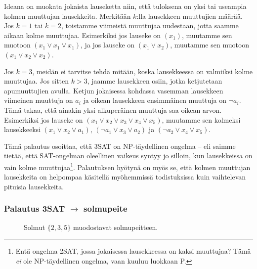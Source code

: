 Ideana on muokata jokaista lauseketta niin, 
että tuloksena on yksi tai useampia kolmen muuttujan lausekkeita.
Merkitään $k$:lla lausekkeen muuttujien määrää.
Jos $k=1$ tai $k=2$, toistamme viimeistä muuttujaa uudestaan,
jotta saamme aikaan kolme muuttujaa.
Esimerkiksi jos lauseke on $(x_1)$, muutamme sen muotoon
$(x_1 \lor x_1 \lor x_1)$, ja jos lauseke on $(x_1 \lor x_2)$, muutamme
sen muotoon $(x_1 \lor x_2 \lor x_2)$.

Jos $k=3$, meidän ei tarvitse tehdä mitään, koska lausekkeessa
on valmiiksi kolme muuttujaa. Jos sitten $k>3$,
jaamme lausekkeen osiin, jotka ketjutetaan apumuuttujien avulla.
Ketjun jokaisessa kohdassa vasemman lausekkeen viimeinen
muuttuja on $a_i$ ja oikean lausekkeen ensimmäinen muuttuja on $\neg a_i$.
Tämä takaa, että ainakin yksi alkuperäinen muuttuja saa oikean arvon.
Esimerkiksi jos lauseke on $(x_1 \lor x_2 \lor x_3 \lor x_4 \lor x_5)$,
muutamme sen kolmeksi lausekkeeksi $(x_1 \lor x_2 \lor a_1)$,
$(\neg a_1 \lor x_3 \lor a_2)$ ja $(\neg a_2 \lor x_4 \lor x_5)$.

Tämä palautus osoittaa, että 3SAT on NP-täydellinen ongelma --
eli saimme tietää, että
SAT-ongelman oleellinen vaikeus syntyy jo silloin, kun lausekkeissa
on vain kolme muuttujaa\footnote{Entä ongelma 2SAT, jossa jokaisessa lausekkeessa
on kaksi muuttujaa? Tämä \emph{ei} ole NP-täydellinen ongelma,
vaan kuuluu luokkaan P.}.
Palautuksen hyötynä on myös se, että kolmen muuttujan lausekkeita
on helpompaa käsitellä myöhemmissä todistuksissa
kuin vaihtelevan pituisia lausekkeita.

\subsubsection{Palautus 3SAT $\rightarrow$ solmupeite}

\begin{figure}
\center
\begin{center}
\end{center}
\caption{Solmut $\{2,3,5\}$ muodostavat solmupeitteen.}
\label{fig:solpei}
\end{figure}

